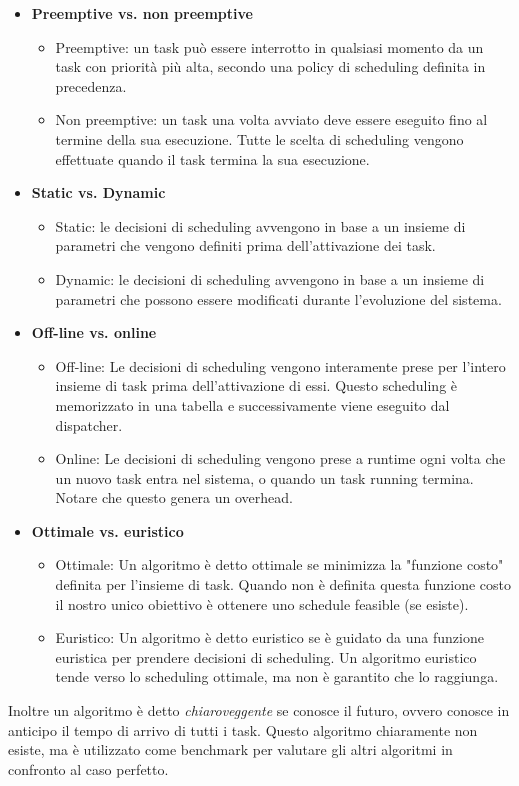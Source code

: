 \documentclass[12pt,openany,onesided]{book}
\begin{document}
\begin{itemize}
    \item \textbf{Preemptive vs. non preemptive}
    \begin{itemize}
        \item Preemptive: un task può essere interrotto in qualsiasi momento da un task con priorità più alta, secondo una policy di scheduling definita in precedenza.
        \item Non preemptive: un task una volta avviato deve essere eseguito fino al termine della sua esecuzione. Tutte le scelta di scheduling vengono effettuate quando il task termina la sua esecuzione.
    \end{itemize}
    \item \textbf{Static vs. Dynamic}
    \begin{itemize}
        \item Static: le decisioni di scheduling avvengono in base a un insieme di parametri che vengono definiti prima dell'attivazione dei task.
        \item Dynamic: le decisioni di scheduling avvengono in base a un insieme di parametri che possono essere modificati durante l'evoluzione del sistema.
    \end{itemize}
    \item \textbf{Off-line vs. online} 
    \begin{itemize}
        \item Off-line: Le decisioni di scheduling vengono interamente prese per l'intero insieme di task prima dell'attivazione di essi.
        Questo scheduling è memorizzato in una tabella e successivamente viene eseguito dal dispatcher.
        \item Online: Le decisioni di scheduling vengono prese a runtime ogni volta che un nuovo task entra nel sistema, o quando un task running termina. Notare che questo genera un overhead.
    \end{itemize}
    \item \textbf{Ottimale vs. euristico}
    \begin{itemize}
        \item Ottimale: Un algoritmo è detto ottimale se minimizza la "funzione costo" definita per l'insieme di task.
        Quando non è definita questa funzione costo il nostro unico obiettivo è ottenere uno schedule feasible (se esiste).
        \item Euristico: Un algoritmo è detto euristico se è guidato da una funzione euristica per prendere decisioni di scheduling.
        Un algoritmo euristico tende verso lo scheduling ottimale, ma non è garantito che lo raggiunga.
    \end{itemize}
\end{itemize}
Inoltre un algoritmo è detto \textit{chiaroveggente} se conosce il futuro, ovvero conosce in anticipo il tempo di arrivo di tutti i task. Questo algoritmo chiaramente non esiste, ma è utilizzato come benchmark per valutare gli altri algoritmi in confronto al caso perfetto.
\end{document}
